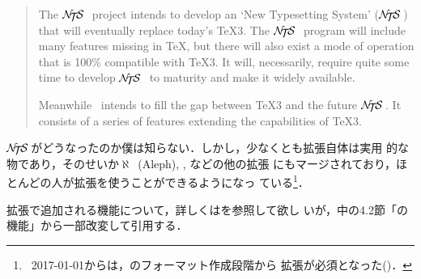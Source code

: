 \documentclass[a4paper,11pt,nomag,dvipdfmx]{jsarticle}
\def\NTS{\leavevmode\hbox{$\cal N\kern-0.35em\lower0.5ex\hbox{$\cal T$}%
  \kern-0.2emS$}\,}
\begin{document}
\begin{quotation}
The \NTS\ project intends to develop an `New Typesetting System' (\NTS)
that will eventually replace today's \TeX3.  The \NTS\ program will
include many features missing in \TeX, but there will also exist a mode
of operation that is 100\% compatible with \TeX3.  It will, necessarily,
require quite some time to develop \NTS\ to maturity and make it widely
available.

Meanwhile \eTeX\ intends to fill the gap between \TeX3 and the future
\NTS. It consists of a series of features extending the capabilities of
\TeX3.
\end{quotation}

\NTS がどうなったのか僕は知らない．しかし，少なくとも\eTeX 拡張自体は実用
的な物であり，そのせいか$\aleph$~(Aleph), , などの他の拡張
にもマージされており，ほとんどの人が\eTeX 拡張を使うことができるようになっ
ている\footnote{\LaTeXe~2017-01-01からは，\LaTeXe のフォーマット作成段階から
\eTeX 拡張が必須となった(\cite{l2e26})．}．

\eTeX 拡張で追加される機能について，詳しくは\cite{etexman}を参照して欲し
いが，\cite{h7k}中の4.2節「\eTeX の機能」から一部改変して引用する．
\end{document}
